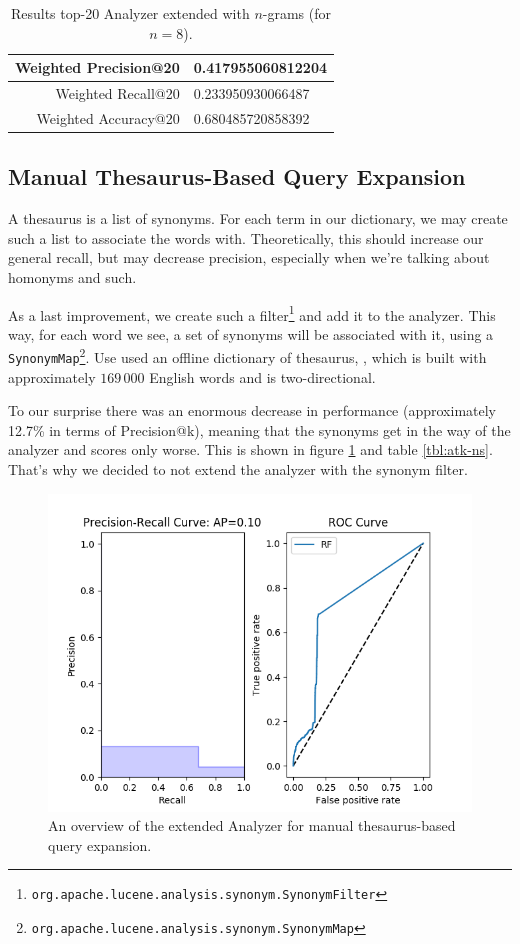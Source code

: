 \documentclass[11pt]{article}
\begin{document}
\begin{table}[htp]
	\centering
	\begin{tabular}{|r|l|}
		\hline
		Weighted \textsf{Precision@20} & 0.417955060812204 \\ \hline
		Weighted \textsf{Recall@20} & 0.233950930066487 \\ \hline
		Weighted \textsf{Accuracy@20} & 0.680485720858392 \\ \hline
	\end{tabular}
	\caption{Results top-20 Analyzer extended with $n$-grams (for $n=8$).}
	\label{tbl:atk-n}
\end{table}

\subsection{Manual Thesaurus-Based Query Expansion}\label{sec:synonyms}
A thesaurus is a list of synonyms. For each term in our dictionary, we may create such a list to associate the words with. Theoretically, this should increase our general recall, but may decrease precision, especially when we're talking about homonyms and such.

As a last improvement, we create such a filter\footnote{\texttt{org.apache.lucene.analysis.synonym.SynonymFilter}} and add it to the analyzer. This way, for each word we see, a set of synonyms will be associated with it, using a \texttt{SynonymMap}\footnote{\texttt{org.apache.lucene.analysis.synonym.SynonymMap}}. Use used an offline dictionary of thesaurus, \cite{synonyms}, which is built with approximately $169\,000$ English words and is two-directional.

To our surprise there was an enormous decrease in performance (approximately 12.7\% in terms of \textsf{Precision@k}), meaning that the synonyms get in the way of the analyzer and scores only worse. This  is shown in figure \ref{fig:synonyms} and table \ref{tbl:atk-ns}. That's why we decided to not extend the analyzer with the synonym filter.

\begin{figure}[htp]
	\centering
	\includegraphics[width=\textwidth]{images/2ndTerm/ExclNgram_afterSynonym}
	\caption{An overview of the extended Analyzer for manual thesaurus-based query expansion.}
	\label{fig:synonyms}
\end{figure}
\end{document}
